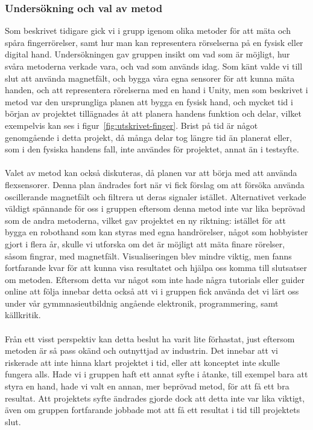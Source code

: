 \documentclass[a4paper]{article}
\begin{document}
\begin{sloppypar}
  \subsubsection{Undersökning och val av metod} %
  Som beskrivet tidigare gick vi i grupp igenom olika metoder för att mäta och spåra fingerrörelser, samt hur man kan representera rörselserna på en fysisk eller digital hand.
  Undersökningen gav gruppen insikt om vad som är möjligt, hur svåra metoderna verkade vara, och vad som används idag.
  Som känt valde vi till slut att använda magnetfält, och bygga våra egna sensorer för att kunna mäta handen, och att representera rörelserna med en hand i Unity, men som beskrivet i metod var den ursprungliga planen att bygga en fysisk hand, och mycket tid i början av projektet tillägnades åt att planera handens funktion och delar, vilket exempelvis kan ses i figur~\ref{fig:utskrivet-finger}.
  Brist på tid är något genomgående i detta projekt, då många delar tog längre tid än planerat eller, som i den fysiska handens fall, inte användes för projektet, annat än i testsyfte.
  \\\\
  Valet av metod kan också diskuteras, då planen var att börja med att använda flexsensorer. Denna plan ändrades fort när vi fick förslag om att försöka använda oscillerande magnetfält och filtrera ut deras signaler istället.
  Alternativet verkade väldigt spännande för oss i gruppen eftersom denna metod inte var lika beprövad som de andra metoderna, vilket gav projektet en ny riktning: istället för att bygga en robothand som kan styras med egna handrörelser, något som hobbyister gjort i flera år, skulle vi utforska om det är möjligt att mäta finare rörelser, såsom fingrar, med magnetfält.
  Visualiseringen blev mindre viktig, men fanns fortfarande kvar för att kunna visa resultatet och hjälpa oss komma till slutsatser om metoden.
  Eftersom detta var något som inte hade några tutorials eller guider online att följa innebar detta också att vi i gruppen fick använda det vi lärt oss under vår gymmnasieutbildnig angående elektronik, programmering, samt källkritik.
  \\\\
  Från ett visst perspektiv kan detta beslut ha varit lite förhastat, just eftersom metoden är så pass okänd och outnyttjad av industrin. Det innebar att vi riskerade att inte hinna klart projektet i tid, eller att konceptet inte skulle fungera alls.
  Hade vi i gruppen haft ett annat syfte i åtanke, till exempel bara att styra en hand, hade vi valt en annan, mer beprövad metod, för att få ett bra resultat.
  Att projektets syfte ändrades gjorde dock att detta inte var lika viktigt, även om gruppen fortfarande jobbade mot att få ett resultat i tid till projektets slut.


\end{sloppypar}
\end{document}
